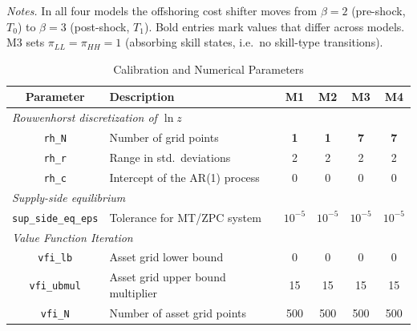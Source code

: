 \documentclass{article}
\begin{document}
\begin{table}[htbp]
\vspace{4pt}
\begin{minipage}{0.92\textwidth}\footnotesize
\textit{Notes.} In all four models the offshoring cost shifter moves from $\beta=2$ (pre-shock, $T_0$) to $\beta=3$ (post-shock, $T_1$). Bold entries mark values that differ across models. M3 sets $\pi_{LL}=\pi_{HH}=1$ (absorbing skill states, i.e.\ no skill-type transitions).
\end{minipage}
\end{table}

\clearpage


\begin{table}[htbp]
\centering
\caption{Calibration and Numerical Parameters}
\label{tab:calib_parameters}
\renewcommand{\arraystretch}{1.25}
\begin{tabular}{clcccc}
\toprule
Parameter & Description & M1 & M2 & M3 & M4 \\
\midrule
\multicolumn{6}{l}{\textit{Rouwenhorst discretization of $\ln z$}} \\[2pt]
\texttt{rh\_N}   & Number of grid points                                     & \textbf{1} & \textbf{1} & \textbf{7} & \textbf{7} \\
\texttt{rh\_r}   & Range in std.\ deviations                                & 2     & 2     & 2     & 2     \\
\texttt{rh\_c}   & Intercept of the AR(1) process                            & 0     & 0     & 0     & 0     \\
\midrule
\multicolumn{6}{l}{\textit{Supply-side equilibrium}} \\[2pt]
\texttt{sup\_side\_eq\_eps} & Tolerance for MT/ZPC system                    & $10^{-5}$ & $10^{-5}$ & $10^{-5}$ & $10^{-5}$ \\
\midrule
\multicolumn{6}{l}{\textit{Value Function Iteration}} \\[2pt]
\texttt{vfi\_lb}           & Asset grid lower bound                         & 0     & 0     & 0     & 0     \\
\texttt{vfi\_ubmul}        & Asset grid upper bound multiplier               & 15    & 15    & 15    & 15    \\
\texttt{vfi\_N}            & Number of asset grid points                     & 500   & 500   & 500   & 500   \\

\end{tabular}
\end{table}
\end{document}

